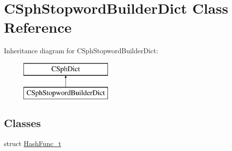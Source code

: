 \hypertarget{classCSphStopwordBuilderDict}{\section{C\-Sph\-Stopword\-Builder\-Dict Class Reference}
\label{classCSphStopwordBuilderDict}
}
Inheritance diagram for C\-Sph\-Stopword\-Builder\-Dict\-:\begin{figure}[H]
\begin{center}
\leavevmode
\includegraphics[height=2.000000cm]{classCSphStopwordBuilderDict}
\end{center}
\end{figure}
\subsection*{Classes}
\begin{DoxyCompactItemize}
\item 
struct \hyperlink{structCSphStopwordBuilderDict_1_1HashFunc__t}{Hash\-Func\-\_\-t}
\end{DoxyCompactItemize}
